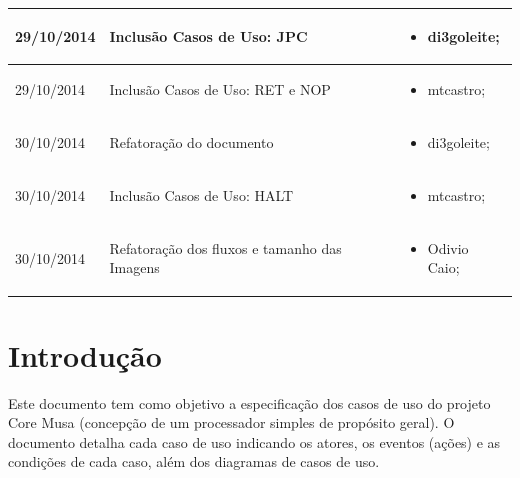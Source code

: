 \documentclass{article}
\begin{document}
\begin{table}[ht]
\begin{tabular}[pos]{|m{2cm} | m{7.2cm} | m{3.8cm}|}
	  \small 29/10/2014 & \small Inclusão Casos de Uso: JPC & \small 
	  \begin{itemize}
	  	\item di3goleite; 
	  \end{itemize}  
	  \\ \hline
	  
	  \small 29/10/2014 & \small Inclusão Casos de Uso: RET e NOP & \small 
      \begin{itemize}
      	\item mtcastro; 
	  \end{itemize}  
	  \\ \hline
	  
	  \small 30/10/2014 & \small Refatoração do documento & \small 
	  \begin{itemize}
	  	\item di3goleite; 
	  \end{itemize}  
	  \\ \hline
	  	 
	  \small 30/10/2014 & \small Inclusão Casos de Uso: HALT & \small 
      \begin{itemize}
      	\item mtcastro; 
	  \end{itemize}
 	   \\ \hline

 	 \small 30/10/2014 & \small Refatoração dos fluxos e tamanho das Imagens & \small 
      \begin{itemize}
      	\item Odivio Caio; 
	  \end{itemize}
	  
	  \\ \hline
    \end{tabular}
  \end{table}

\newpage

\tableofcontents
\newpage

\section{Introdução}
Este documento tem como objetivo a especificação dos casos de uso do projeto Core Musa (concepção de um processador simples de propósito geral). O documento detalha cada caso de uso indicando os atores, os eventos (ações) e as condições de cada caso, além dos diagramas de casos de uso.
\end{document}

